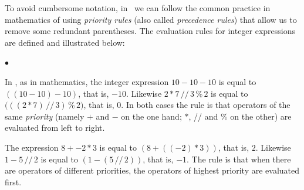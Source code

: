 {\begin{minipage}{\myparboxwidth}
\indent To avoid cumbersome notation, in \python\ we can follow the common practice in
mathematics of using {\em priority rules} (also called {\em precedence
rules}) that allow us to remove
some redundant parentheses.
The evaluation rules for integer expressions are
defined and illustrated below:
\begin{list}{$\scriptscriptstyle\bullet$}{
}
\item In \python, as in mathematics, the integer expression
$10 - 10 - 10$ is equal to $((10 - 10) - 10)$, that is, $-10$.  Likewise $ 2 \ast 7 \,/\!/
\, 3\,${\idt \%}$\, 2$ is equal to $(((2 \ast 7) \,/\!/\, 3)\,${\idt \%}$\, 2)$, that is, $0$.
In both cases the rule is that operators of the same {\em priority} (namely $+$ and
$-$ on the one hand; $\ast$, {\idt //} and {\idt \%} on the other) are evaluated from left to right.
\item The expression $8 + - 2 \ast 3$ is equal to $(8 + ((-2) \ast 3))$, that is, $2$.  Likewise
\hbox{$1 - 5\,/\!/\,2$}
is equal to $(1 - (5\,/\!/\,2))$, that is, $-1$. The rule is that when there are operators of
different priorities, the operators of highest priority are evaluated first.
\end{list}

\vspace{\abovedisplayskip}
\end{minipage}
}

